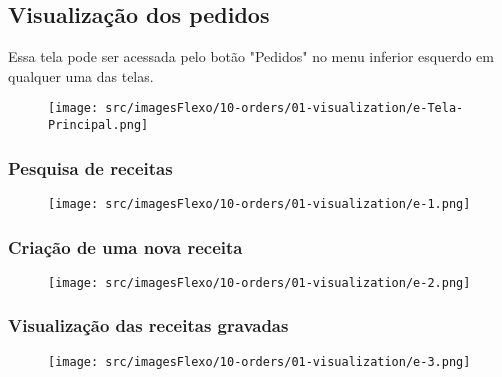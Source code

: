 \thispagestyle{fancy}
\vspace*{40 pt}
\subsection{Visualização dos pedidos}\label{telaVisualizacaoPedidos}
 Essa tela pode ser acessada pelo botão "Pedidos" no menu inferior esquerdo em qualquer uma das telas.
 \vspace*{\fill}
 \begin{figure}[h]
  \centering
  \texttt{[image: src/imagesFlexo/10-orders/01-visualization/e-Tela-Principal.png]}
\end{figure}
\vspace*{\fill}

\newpage
\thispagestyle{fancy}
\vspace*{40 pt}
\subsubsection{\small{Pesquisa de receitas}}\label{telaVisualizacaoPedidosPesquisaDeReceitas}
\vspace*{\fill}
\begin{figure}[h]
  \centering
  \texttt{[image: src/imagesFlexo/10-orders/01-visualization/e-1.png]}
\end{figure}
\vspace*{\fill}

\newpage
\thispagestyle{fancy}
\vspace*{40 pt}
\subsubsection{\small{Criação de uma nova receita}}\label{telaVisualizacaoPedidosCriacaoDeUmaNovaReceita}
\vspace*{\fill}
\begin{figure}[h]
  \centering
  \texttt{[image: src/imagesFlexo/10-orders/01-visualization/e-2.png]}
\end{figure}
\vspace*{\fill}

\newpage
\thispagestyle{fancy}
\vspace*{40 pt}
\subsubsection{\small{Visualização das receitas gravadas}}\label{telaVisualizacaoPedidosVisualizacaoDasReceitasGravadas}
\vspace*{\fill}
\begin{figure}[h]
  \centering
  \texttt{[image: src/imagesFlexo/10-orders/01-visualization/e-3.png]}
\end{figure}
\vspace*{\fill}


